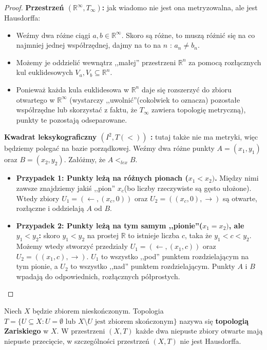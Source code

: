 \begin{proof}
\noindent \textbf{Przestrzeń $\left( \mathbb{R}^{\infty}, T_{\infty} \right) $:} jak wiadomo nie jest ona metryzowalna, ale jest Hausdorffa:
\begin{itemize}
	\item Weźmy dwa różne ciągi $a,b \in \mathbb{R}^{\infty}$. Skoro są różne, to muszą różnić się na co najmniej jednej współrzędnej, dajmy na to na $n$ : $a_{n} \neq b_{n} $.
	\item Możemy je oddzielić wewnątrz ,,małej'' przestrzeni $\mathbb{R}^{n}$ za pomocą rozłącznych kul euklidesowych $V_{a}, V_{b} \subseteq \mathbb{R}^{n}$.
	\item Ponieważ każda kula euklidesowa w $\mathbb{R}^{n}$ daje się rozszerzyć do zbioru otwartego w $\mathbb{R}^{\infty}$ (wystarczy ,,uwolnić''(cokolwiek to oznacza) pozostałe współrzędne lub skorzystać z faktu, że $T_{\infty}$ zawiera topologię metryczną), punkty te pozostają odseparowane.
\end{itemize}

\noindent \textbf{Kwadrat leksykograficzny $\left( I^2, T\left( < \right)  \right) $ :} tutaj także nie ma metryki, więc będziemy polegać na bazie porządkowej. Weźmy dwa różne punkty $A = \left( x_1,y_1 \right) $ oraz $B = \left( x_2,y_2 \right) $. Załóżmy, że $A <_{lex} B$.
\begin{itemize}
	\item \textbf{Przypadek 1: Punkty leżą na różnych pionach ($x_1<x_2)$.} Między nimi zawsze znajdziemy jakiś ,,pion'' $x_{c}$(bo liczby rzeczywiste są gęsto ułożone). Wtedy zbiory $U_1 = \left( \leftarrow , \left( x_{c}, 0 \right)  \right) $ oraz $U_2 = \left( \left( x_{c}, 0 \right) , \rightarrow  \right) $ są otwarte, rozłączne i oddzielają $A$ od $B$.
	\item \textbf{Przypadek 2: Punkty leżą na tym samym ,,pionie''($x_1 = x_2)$, ale $y_1<y_2$:} skoro $y_1<y_2$ na prostej $\mathbb{R}$ to istnieje liczba $c$, taka że $y_1<c<y_2$. Możemy wtedy stworzyć przedziały $U_1 = \left( \leftarrow , \left( x_1,c \right)  \right) $ oraz $U_2 = \left(\left( x_1,c \right) , \rightarrow  \right) $. $U_1$ to wszystko ,,pod'' punktem rozdzielającym na tym pionie, a $U_2$ to wszystko ,,nad'' punktem rozdzielającym. Punkty $A$ i $B$ wpadają do odpowiednich, rozłącznych półprostych.
\end{itemize}
\end{proof} 
\begin{eg}
	Niech $X$ będzie zbiorem nieskończonym. Topologia $T = \{U \subseteq X: U = \emptyset \text{ lub } X\setminus U \text{ jest zbiorem skończonym}\} $ nazywa się \textbf{topologią Zariskiego} w $X$. W przestrzeni $\left( X,T \right) $ każde dwa niepuste zbiory otwarte mają niepuste przecięcie, w szczególności przestrzeń $\left( X, T \right) $ nie jest Hausdorffa.
\end{eg} 
